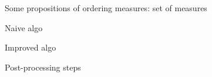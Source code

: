Some propositions of ordering measures: set of measures

Naive algo

Improved algo

Post-processing steps